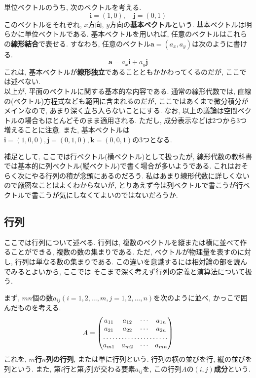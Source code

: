         単位ベクトルのうち, 次のベクトルを考える.
        \begin{equation}
            \bm{i}=(1,0),\quad \bm{j}=(0,1) \label{eq:線形代数:平面の基本ベクトル}
        \end{equation}
        このベクトルをそれぞれ, $x$方向, $y$方向の\textbf{基本ベクトル}という. 基本ベクトルは明らかに単位ベクトルである.
        基本ベクトルを用いれば, 任意のベクトルはこれらの\textbf{線形結合}で表せる. すなわち, 任意のベクトル$\bm{a}=(a_x,a_y)$は次のように書ける.
        \begin{equation}
            \bm{a}=a_x\bm{i}+a_y\bm{j} \label{eq:線形代数:基本ベクトルの線形結合}
        \end{equation}
        これは, 基本ベクトルが\textbf{線形独立}であることともかかわってくるのだが, ここでは述べない.\\

        以上が, 平面のベクトルに関する基本的な内容である. 通常の線形代数では, 直線の(ベクトル)方程式なども範囲に含まれるのだが, ここではあくまで微分積分がメインなので, あまり深く立ち入らないことにする. 
        なお, 以上の議論は空間ベクトルの場合もほとんどそのまま適用される. ただし, 成分表示などは2つから3つ増えることに注意. また, 基本ベクトルは$\bm{i}=(1,0,0),\bm{j}=(0,1,0),\bm{k}=(0,0,1)$の3つとなる.

        補足として, ここでは行ベクトル(横ベクトル)として扱ったが, 線形代数の教科書では基本的に列ベクトル(縦ベクトル)で書く場合が多いようである. これはおそらく次にやる行列の積が念頭にあるのだろう. 
        私はあまり線形代数に詳しくないので厳密なことはよくわからないが, とりあえず今は列ベクトルで書こうが行ベクトルで書こうが気にしなくてよいのではないだろうか.
    \clearpage
    \subsection{行列}
        ここでは行列について述べる. 行列は, 複数のベクトルを縦または横に並べて作ることができる, 複数の数の集まりである. ただ, ベクトルが物理量を表すのに対し, 行列は単なる数の集まりである. この違いを意識するには相対論の部を読んでみるとよいから, ここでは
        そこまで深く考えず行列の定義と演算法について扱う.

        
        まず, $mn$個の数$a_{ij}(i=1,2,\dots,m,j=1,2,\dots,n)$を次のように並べ, かっこで囲んだものを考える.
        \begin{equation}
            A=\begin{pmatrix}
                a_{11} & a_{12} & \cdots & a_{1n}\\
                a_{21} & a_{22} & \cdots & a_{2n}\\
                \hdotsfor{4}\\
                a_{m1} & a_{m2} & \cdots & a_{mn}
            \end{pmatrix} \label{eq:線形代数:行列の定義}
        \end{equation}
        これを, \textbf{$m$行$n$列の行列}, または単に行列という. 行列の横の並びを行, 縦の並びを列という.
        また, 第$i$行と第$j$列が交わる要素$a_{ij}$を, この行列$A$の\textbf{$(i,j)$成分}という.


